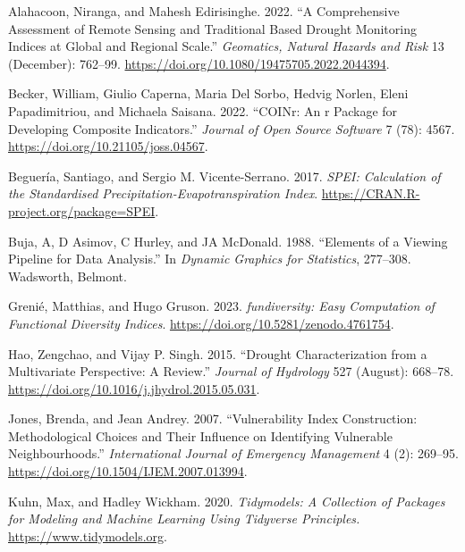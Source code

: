 \documentclass[
]{interact}
\newlength{\cslhangindent}
\newlength{\cslentryspacingunit} %
\newenvironment{CSLReferences}[2] %
 {%
  \setlength{\parindent}{0pt}
  \ifodd #1
  \let\oldpar\par
  \def\par{\hangindent=\cslhangindent\oldpar}
  \fi
  \setlength{\parskip}{#2\cslentryspacingunit}
 }%
 {}
\begin{document}
\hypertarget{refs}{}
\begin{CSLReferences}{1}{0}
\leavevmode{}%
Alahacoon, Niranga, and Mahesh Edirisinghe. 2022. {``A Comprehensive
Assessment of Remote Sensing and Traditional Based Drought Monitoring
Indices at Global and Regional Scale.''} \emph{Geomatics, Natural
Hazards and Risk} 13 (December): 762--99.
\url{https://doi.org/10.1080/19475705.2022.2044394}.

\leavevmode{}%
Becker, William, Giulio Caperna, Maria Del Sorbo, Hedvig Norlen, Eleni
Papadimitriou, and Michaela Saisana. 2022. {``COINr: An r Package for
Developing Composite Indicators.''} \emph{Journal of Open Source
Software} 7 (78): 4567. \url{https://doi.org/10.21105/joss.04567}.

\leavevmode{}%
Beguería, Santiago, and Sergio M. Vicente-Serrano. 2017. \emph{SPEI:
Calculation of the Standardised Precipitation-Evapotranspiration Index}.
\url{https://CRAN.R-project.org/package=SPEI}.

\leavevmode{}%
Buja, A, D Asimov, C Hurley, and JA McDonald. 1988. {``Elements of a
Viewing Pipeline for Data Analysis.''} In \emph{Dynamic Graphics for
Statistics}, 277--308. Wadsworth, Belmont.

\leavevmode{}%
Grenié, Matthias, and Hugo Gruson. 2023. \emph{{fundiversity}: Easy
Computation of Functional Diversity Indices}.
\url{https://doi.org/10.5281/zenodo.4761754}.

\leavevmode{}%
Hao, Zengchao, and Vijay P. Singh. 2015. {``Drought Characterization
from a Multivariate Perspective: {A} Review.''} \emph{Journal of
Hydrology} 527 (August): 668--78.
\url{https://doi.org/10.1016/j.jhydrol.2015.05.031}.

\leavevmode{}%
Jones, Brenda, and Jean Andrey. 2007. {``Vulnerability Index
Construction: Methodological Choices and Their Influence on Identifying
Vulnerable Neighbourhoods.''} \emph{International Journal of Emergency
Management} 4 (2): 269--95.
\url{https://doi.org/10.1504/IJEM.2007.013994}.

\leavevmode{}%
Kuhn, Max, and Hadley Wickham. 2020. \emph{Tidymodels: A Collection of
Packages for Modeling and Machine Learning Using Tidyverse Principles.}
\url{https://www.tidymodels.org}.


\end{CSLReferences}
\end{document}
